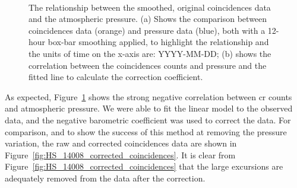 \begin{figure}[ht!]
	\centering
	\hspace{1em}
	 \\
	
	\caption{The relationship between the smoothed, original coincidences data and the atmospheric pressure. (a) Shows the comparison between coincidences data (orange) and pressure data (blue), both with a 12-hour box-bar smoothing applied, to highlight the relationship and the units of time on the x-axis are: YYYY-MM-DD; (b) shows the correlation between the coincidences counts and pressure and the fitted line to calculate the correction coefficient.}
	\label{fig:14008_CR_V_P_corr}
\end{figure}



As expected, Figure~\ref{fig:14008_CR_V_P_corr} shows the strong negative correlation between \gls{cr} counts and atmospheric pressure. We were able to fit the linear model to the observed data, and the negative barometric coefficient was used to correct the data. For comparison, and to show the success of this method at removing the pressure variation, the raw and corrected coincidences data are shown in Figure~\ref{fig:HS_14008_corrected_coincidences}. It is clear from Figure~\ref{fig:HS_14008_corrected_coincidences} that the large excursions are adequately removed from the data after the correction.


